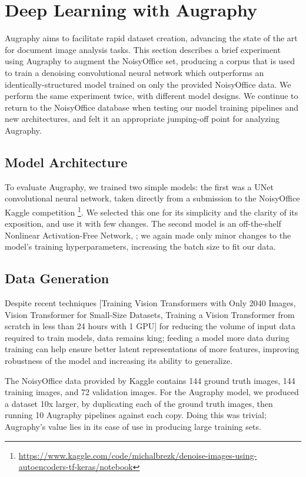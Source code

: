 \documentclass[runningheads]{llncs}
\begin{document}
\section{Deep Learning with Augraphy}
Augraphy aims to facilitate rapid dataset creation, advancing the state of the art for document image analysis tasks.
This section describes a brief experiment using Augraphy to augment the NoisyOffice set, producing a corpus that is used to train a denoising convolutional neural network which outperforms an identically-structured model trained on only the provided NoisyOffice data. We perform the same experiment twice, with different model designs.
We continue to return to the NoisyOffice database when testing our model training pipelines and new architectures, and felt it an appropriate jumping-off point for analyzing Augraphy.

\subsection{Model Architecture}
To evaluate Augraphy, we trained two simple models: the first was a UNet convolutional neural network, taken directly from a submission to the NoisyOffice Kaggle competition  \footnote{\url{https://www.kaggle.com/code/michalbrezk/denoise-images-using-autoencoders-tf-keras/notebook}}. We selected this one for its simplicity and the clarity of its exposition, and use it with few changes. The second model is an off-the-shelf Nonlinear Activation-Free Network, \cite{NAFNet}; we again made only minor changes to the model's training hyperparameters, increasing the batch size to fit our data.

\subsection{Data Generation}
Despite recent techniques [Training Vision Transformers with Only 2040 Images, Vision Transformer for Small-Size Datasets, Training a Vision Transformer from scratch in less than 24 hours with 1 GPU] for reducing the volume of input data required to train models, data remains king; feeding a model more data during training can help ensure better latent representations of more features, improving robustness of the model and increasing its ability to generalize.

The NoisyOffice data provided by Kaggle contains 144 ground truth images, 144 training images, and 72 validation images.
For the Augraphy model, we produced a dataset 10x larger, by duplicating each of the ground truth images, then running 10 Augraphy pipelines against each copy.
Doing this was trivial; Augraphy's value lies in its ease of use in producing large training sets.
\end{document}
